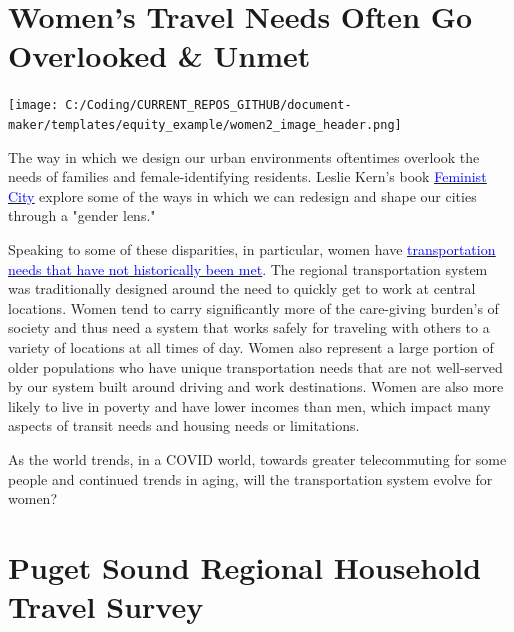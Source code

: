 \documentclass[
  12pt,
]{article}
\author{}
\date{\vspace{-2.5em}}
\begin{document}
\hypertarget{womens-travel-needs-often-go-overlooked-unmet}{%
\section{Women's Travel Needs Often Go Overlooked \&
Unmet}\label{womens-travel-needs-often-go-overlooked-unmet}}

\texttt{[image: C:/Coding/CURRENT\_REPOS\_GITHUB/document-maker/templates/equity\_example/women2\_image\_header.png]}

\begin{flushleft}
The way in which we design our urban environments oftentimes overlook the needs of families and female-identifying residents. Leslie Kern's book \href{https://metropolismag.com/viewpoints/leslie-kern-feminist-city/}{\underline{\textcolor{blue}{Feminist City}}} explore some of the ways in which we can redesign and shape our cities through a "gender lens." \smallskip

Speaking to some of these disparities, in particular, women have \href{http://libraryarchives.metro.net/DB_Attachments/2019-0294/UnderstandingHowWomenTravel_FullReport_FINAL.pdf}{\underline{\textcolor{blue}{transportation needs that have not historically been met}}}. The regional transportation system was traditionally designed around the need to quickly get to work at central locations. Women tend to carry significantly more of the care-giving burden's of society and thus need a system that works safely for traveling with others to a variety of locations at all times of day. Women also represent a large portion of older populations who have unique transportation needs that are not well-served by our system built around driving and work destinations. Women are also more likely to live in poverty and have lower incomes than men, which impact many aspects of transit needs and housing needs or limitations.\smallskip

As the world trends, in a COVID world, towards greater telecommuting for some people and continued trends in aging, will the transportation system evolve for women?
\end{flushleft}

\newpage
\setlength{\headheight}{10pt}
\setlength{\textheight}{665pt}
\fancyhead[L]{}

\hypertarget{puget-sound-regional-household-travel-survey}{%
\section{Puget Sound Regional Household Travel
Survey}\label{puget-sound-regional-household-travel-survey}}
\end{document}
